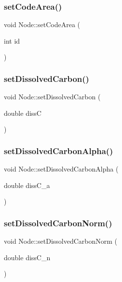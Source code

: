 \subsubsection{\texorpdfstring{setCodeArea()}{setCodeArea()}}
{\footnotesize\ttfamily void Node\+::set\+Code\+Area (\begin{DoxyParamCaption}\item[{int}]{id }\end{DoxyParamCaption})\hspace{0.3cm}{\ttfamily [inline]}}

\mbox{\label{class_node_a6bdac2f6812a12a035768980818b2fde}} 
\subsubsection{\texorpdfstring{setDissolvedCarbon()}{setDissolvedCarbon()}}
{\footnotesize\ttfamily void Node\+::set\+Dissolved\+Carbon (\begin{DoxyParamCaption}\item[{double}]{dissC }\end{DoxyParamCaption})\hspace{0.3cm}{\ttfamily [inline]}}

\mbox{\label{class_node_aa4a29b49baa827469c25fe9e54f683f1}} 
\subsubsection{\texorpdfstring{setDissolvedCarbonAlpha()}{setDissolvedCarbonAlpha()}}
{\footnotesize\ttfamily void Node\+::set\+Dissolved\+Carbon\+Alpha (\begin{DoxyParamCaption}\item[{double}]{diss\+C\+\_\+a }\end{DoxyParamCaption})\hspace{0.3cm}{\ttfamily [inline]}}

\mbox{\label{class_node_aa2bfb4dabb1d6b7d5e23cb0ab63c5ba2}} 
\subsubsection{\texorpdfstring{setDissolvedCarbonNorm()}{setDissolvedCarbonNorm()}}
{\footnotesize\ttfamily void Node\+::set\+Dissolved\+Carbon\+Norm (\begin{DoxyParamCaption}\item[{double}]{diss\+C\+\_\+n }\end{DoxyParamCaption})\hspace{0.3cm}{\ttfamily [inline]}}

